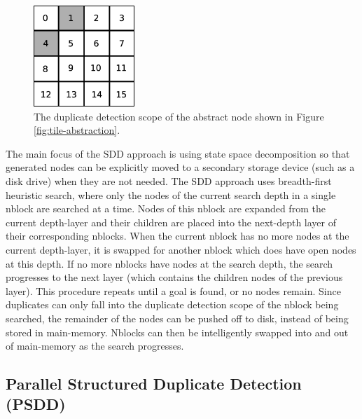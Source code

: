 \documentclass{article} \usepackage{aaai} \usepackage{graphicx}
\begin{document}
\begin{figure}[t]
\begin{center}
\includegraphics[width=1.5in]{images/duplicate-detection-scope.eps}
\caption{The duplicate detection scope of the abstract node shown in
  Figure \ref{fig:tile-abstraction}.}
\label{fig:duplicate-detection-scope}
\end{center}
\end{figure}

The main focus of the SDD approach is using state space decomposition
so that generated nodes can be explicitly moved to a secondary storage
device (such as a disk drive) when they are not needed.  The SDD
approach uses breadth-first heuristic search, where only the nodes of
the current search depth in a single nblock are searched at a time.
Nodes of this nblock are expanded from the current depth-layer and
their children are placed into the next-depth layer of their
corresponding nblocks.  When the current nblock has no more nodes at
the current depth-layer, it is swapped for another nblock which does
have open nodes at this depth.  If no more nblocks have nodes at the
search depth, the search progresses to the next layer (which contains
the children nodes of the previous layer).  This procedure repeats
until a goal is found, or no nodes remain. Since duplicates can only
fall into the duplicate detection scope of the nblock being searched,
the remainder of the nodes can be pushed off to disk, instead of being
stored in main-memory.  Nblocks can then be intelligently swapped into
and out of main-memory as the search progresses.

\subsection{Parallel Structured Duplicate Detection (PSDD)}
\end{document}
